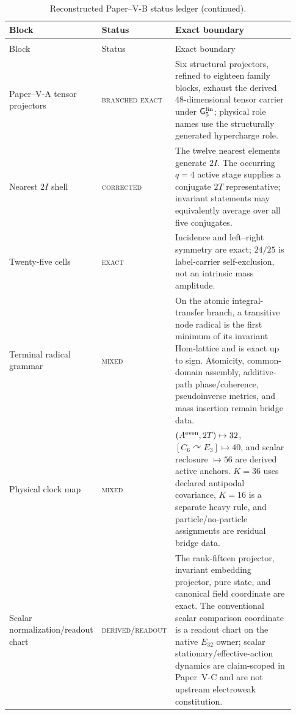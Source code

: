 \documentclass[12pt,a4paper]{article}
\newcommand{\Gfive}{\mathsf G_5^{\rm fin}}
\newcommand{\PVIStatus}[1]{\textnormal{\textsc{#1}}}
\begin{document}
\begingroup
\footnotesize
\renewcommand{\arraystretch}{1.12}
\setlength{\tabcolsep}{3pt}
\begin{longtable}{@{}>{\raggedright\arraybackslash}p{0.25\linewidth}
                    >{\raggedright\arraybackslash}p{0.24\linewidth}
                    >{\raggedright\arraybackslash}p{0.44\linewidth}@{}}
\caption{Reconstructed Paper--V-B status ledger.}
\label{p6:tab:status-ledger}\\
\toprule
Block & Status & Exact boundary \\
\midrule
\endfirsthead
\caption[]{Reconstructed Paper--V-B status ledger (continued).}\\
\toprule
Block & Status & Exact boundary \\
\midrule
\endhead
\bottomrule
\endfoot

Paper--V-A tensor projectors
& \PVIStatus{branched exact}
& Six structural projectors, refined to eighteen family blocks, exhaust the
derived \(48\)-dimensional tensor carrier under \(\Gfive\); physical role
names use the structurally generated hypercharge role. \\
Nearest \(2I\) shell
& \PVIStatus{corrected}
& The twelve nearest elements generate \(2I\).  The occurring \(q=4\) active
stage supplies a conjugate \(2T\) representative; invariant statements may
equivalently average over all five conjugates. \\
Twenty-five cells
& \PVIStatus{exact}
& Incidence and left--right symmetry are exact; \(24/25\) is label-carrier
self-exclusion, not an intrinsic mass amplitude. \\
Terminal radical grammar
& \PVIStatus{mixed}
& On the atomic integral-transfer branch, a transitive node radical is the
first minimum of its invariant Hom-lattice and is exact up to sign.
Atomicity, common-domain assembly, additive-path
phase/coherence, pseudoinverse metrics, and mass insertion remain bridge data. \\
Physical clock map
& \PVIStatus{mixed}
& \((A^{\rm even},2T)\mapsto32\),
\([C_6\curvearrowright E_3]\mapsto40\), and scalar reclosure \(\mapsto56\)
are derived active anchors.  \(K=36\) uses declared antipodal covariance,
\(K=16\) is a separate heavy rule, and particle/no-particle assignments are
residual bridge data. \\
Scalar normalization/readout chart
& \PVIStatus{derived/readout}
& The rank-fifteen projector, invariant embedding projector, pure state, and
canonical field coordinate are exact.  The conventional scalar comparison
coordinate is a readout chart on the native \(E_{32}\) owner; scalar stationary/effective-action dynamics are claim-scoped in Paper~V-C and are not upstream electroweak constitution. \\

\end{longtable}
\end{document}

